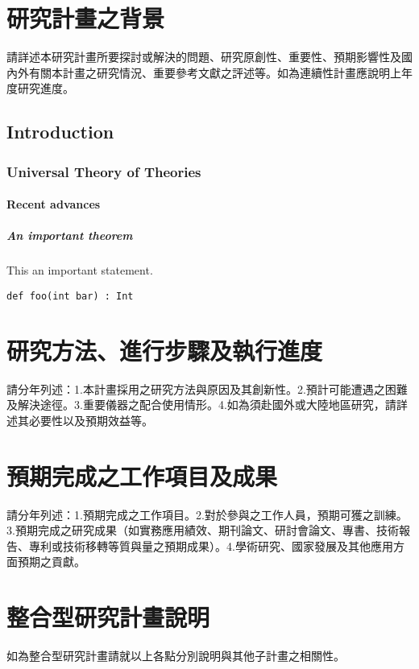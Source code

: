 \documentclass[libertine]{cm03}
\begin{document}
\section{研究計畫之背景}
請詳述本研究計畫所要探討或解決的問題、研究原創性、重要性、預期影響性及國內外有關本計畫之研究情況、重要參考文獻之評述等。如為連續性計畫應說明上年度研究進度。

\subsection{Introduction}

\blindtext

\subsubsection{Universal Theory of Theories}

\blindtext

\paragraph{Recent advances}

\blindtext

\subparagraph{An important theorem}

\begin{theorem}
  This an important statement.
\end{theorem}

\texttt{def foo(int bar) : Int}
\section{研究方法、進行步驟及執行進度}
請分年列述：1.本計畫採用之研究方法與原因及其創新性。2.預計可能遭遇之困難及解決途徑。3.重要儀器之配合使用情形。4.如為須赴國外或大陸地區研究，請詳述其必要性以及預期效益等。

\section{預期完成之工作項目及成果}
請分年列述：1.預期完成之工作項目。2.對於參與之工作人員，預期可獲之訓練。3.預期完成之研究成果（如實務應用績效、期刊論文、研討會論文、專書、技術報告、專利或技術移轉等質與量之預期成果）。4.學術研究、國家發展及其他應用方面預期之貢獻。

\section{整合型研究計畫說明}
如為整合型研究計畫請就以上各點分別說明與其他子計畫之相關性。

\nocite{greenwade93,knuth86}



\end{document}
